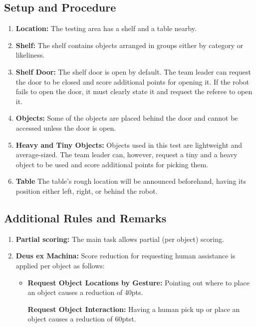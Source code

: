 \subsection*{Setup and Procedure}
\begin{enumerate}
	\item \textbf{Location:} The testing area has a shelf and a table nearby.

	\item \textbf{Shelf:} The shelf contains objects arranged in groups either by category or likeliness.

	\item \textbf{Shelf Door:} The shelf door is open by default.
	The team leader can request the door to be closed and score additional points for opening it. If the robot fails to open the door, it must clearly state it and request the referee to open it.

	\item \textbf{Objects:} Some of the objects are placed behind the door and cannot be accessed unless the door is open.
	
	\item \textbf{Heavy and Tiny Objects:} Objects used in this test are lightweight and average-sized.
	The team leader can, however, request a tiny and a heavy object to be used and score additional points for picking them.

	\item \textbf{Table} The table's rough location will be announced beforehand, having its position either left, right, or behind the robot.
\end{enumerate}


%
%
\subsection*{Additional Rules and Remarks}
\begin{enumerate}
	\item \textbf{Partial scoring:} The main task allows partial (per object) scoring.
	\item \textbf{Deus ex Machina:} Score reduction for requesting human assistance is applied per object as follows:
	\begin{itemize}[nosep]
		\item \textbf{Request Object Locations by Gesture:} Pointing out where to place an object causes a reduction of 40pts.
		
		\textbf{Request Object Interaction:} Having a human pick up or place an object causes a reduction of 60ptst.
	\end{itemize}
\end{enumerate}

